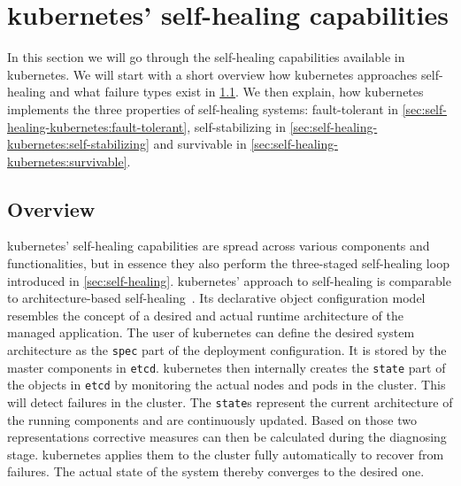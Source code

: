 
\section{\Gls{kubernetes}' self-healing capabilities}\label{sec:self-healing-kubernetes}
  In this section we will go through the self-healing capabilities available in \gls{kubernetes}.
  We will start with a short overview how \gls{kubernetes} approaches self-healing and what failure types exist in \cref{sec:self-healing-kubernetes:overview}.
  We then explain, how \gls{kubernetes} implements the three properties of self-healing systems: fault-tolerant in \cref{sec:self-healing-kubernetes:fault-tolerant}, self-stabilizing in \cref{sec:self-healing-kubernetes:self-stabilizing} and survivable in \cref{sec:self-healing-kubernetes:survivable}.

\subsection{Overview}\label{sec:self-healing-kubernetes:overview}
  \gls{kubernetes}' self-healing capabilities are spread across various components and functionalities, but in essence they also perform the three-staged self-healing loop introduced in \cref{sec:self-healing}.
  \gls{kubernetes}' approach to self-healing is comparable to architecture-based self-healing~\cite{ToffettiMicroservices,DashofyArchitecture}.
  Its declarative object configuration model resembles the concept of a desired and actual runtime architecture of the managed application.
  The user of \gls{kubernetes}
  can define the desired system architecture as the \texttt{spec} part of the deployment configuration.
  It is stored by the master components in \texttt{etcd}.
  \Gls{kubernetes} then internally creates the \texttt{state} part of the objects in \texttt{etcd} by monitoring the actual nodes and pods in the cluster.
  This will detect failures in the cluster.
  The \texttt{state}s represent the current architecture of the running components and are continuously updated.
  Based on those two representations corrective measures can then be calculated during the diagnosing stage.
  \Gls{kubernetes} applies them to the cluster fully automatically to recover from failures.
  The actual state of the system thereby converges to the desired one.


